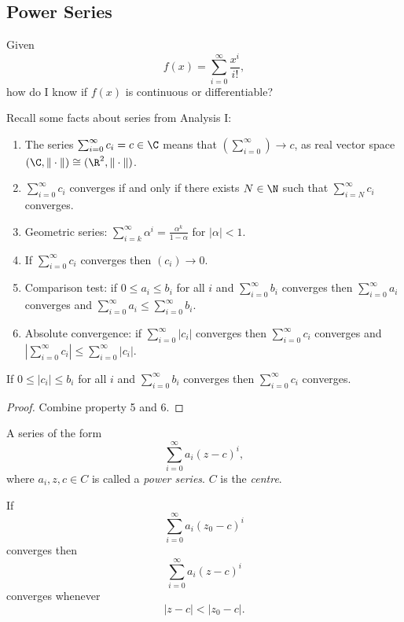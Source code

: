 \documentclass[a4paper]{article}
\theoremstyle{definition}
\begin{document}
\subsection{Power Series}

\begin{question}
  Given
  \[
    f(x) = \sum_{i=0}^{\infty} \frac{x^i}{i!},
  \]
  how do I know if \(f(x)\) is continuous or differentiable?
\end{question}

Recall some facts about series from Analysis I:
\begin{enumerate}
\item The series \(\sum_{i=0}^{\infty}c_i = c\in\C \) means that \((\sum_{i=0}^{\infty})\to c\), as real vector space \((\C, \|\cdot\|) \cong (\R^2, \|\cdot\|)\).
\item \(\sum_{i=0}^{\infty}c_i \) converges if and only if there exists \(N\in\N\) such that \(\sum_{i=N}^{\infty}c_i \) converges.
\item Geometric series: \(\sum_{i=k}^{\infty}\alpha^i = \frac{\alpha^k}{1-\alpha} \) for \(|\alpha|<1\).
\item If \(\sum_{i=0}^{\infty}c_i \) converges then \((c_i)\to 0\).
\item Comparison test: if \(0 \leq a_i \leq b_i\) for all \(i\) and \(\sum_{i=0}^{\infty}b_i \) converges then \(\sum_{i=0}^{\infty}a_i \) converges and \(\sum_{i=0}^{\infty}a_i \leq \sum_{i=0}^{\infty}b_i \).
\item Absolute convergence: if \(\sum_{i=0}^{\infty}|c_i| \) converges then \(\sum_{i=0}^{\infty}c_i \) converges and \(|\sum_{i=0}^{\infty}c_i| \leq \sum_{i=0}^{\infty}|c_i| \).
\end{enumerate}

\begin{lemma}
  If \(0 \leq |c_i| \leq b_i \) for all \(i\) and \(\sum_{i=0}^{\infty}b_i \) converges then \(\sum_{i=0}^{\infty}c_i \) converges.
\end{lemma}

\begin{proof}
  Combine property 5 and 6.
\end{proof}

\begin{definition}
A series of the form
\[
\sum_{i=0}^{\infty}a_i(z-c)^i,
\]
where \(a_i,z,c\in C\) is called a \emph{power series}. \(C\) is the \emph{centre}.
\end{definition}

\begin{proposition}
  \label{prop:pointwise convergence of series}
  If
  \[
    \sum_{i=0}^{\infty}a_i(z_0-c)^i
  \]
  converges then
  \[
    \sum_{i=0}^{\infty}a_i(z-c)^i
  \]
  converges whenever
  \[
|z-c| < |z_0-c|.
  \]
\end{proposition}
\end{document}
